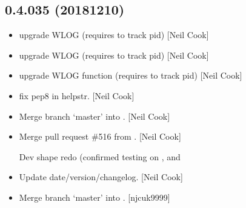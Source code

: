 \documentclass[a4paper,10pt,english]{report}
\begin{document}
\subsection{0.4.035 (2018\sphinxhyphen{}12\sphinxhyphen{}10)}
\label{\detokenize{misc/changelog:id260}}\begin{itemize}
\item {} 
 \sphinxhyphen{} upgrade WLOG (requires  to track pid)
{[}Neil Cook{]}

\item {} 
 \sphinxhyphen{} upgrade WLOG (requires  to track pid)
{[}Neil Cook{]}

\item {} 
 \sphinxhyphen{} upgrade WLOG function (requires  to track
pid) {[}Neil Cook{]}

\item {} 
 \sphinxhyphen{} fix pep8 in helpstr. {[}Neil Cook{]}

\item {} 
Merge branch ‘master’ into . {[}Neil Cook{]}

\item {} 
Merge pull request \#516 from . {[}Neil Cook{]}

Dev shape redo (confirmed testing on ,  and 

\item {} 
Update date/version/changelog. {[}Neil Cook{]}

\item {} 
Merge branch ‘master’ into . {[}njcuk9999{]}

\end{itemize}
\end{document}
